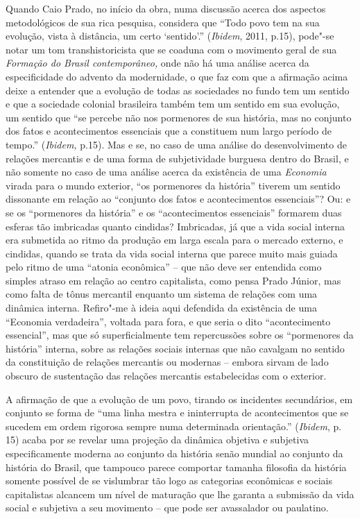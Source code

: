 Quando Caio Prado, no início da obra, numa discussão acerca dos aspectos
metodológicos de sua rica pesquisa, considera que ``Todo povo tem na sua
evolução, vista à distância, um certo `sentido'.'' (\emph{Ibidem}, 2011,
p.15), pode"-se notar um tom transhistoricista que se coaduna com o
movimento geral de sua \emph{Formação do Brasil contemporâneo,} onde não
há uma análise acerca da especificidade do advento da modernidade, o que
faz com que a afirmação acima deixe a entender que a evolução de todas
as sociedades no fundo tem um sentido e que a sociedade colonial
brasileira também tem um sentido em sua evolução, um sentido que ``se
percebe não nos pormenores de sua história, mas no conjunto dos fatos e
acontecimentos essenciais que a constituem num largo período de tempo.''
(\emph{Ibidem,} p.15). Mas e se, no caso de uma análise do
desenvolvimento de relações mercantis e de uma forma de subjetividade
burguesa dentro do Brasil, e não somente no caso de uma análise acerca
da existência de uma \emph{Economia} virada para o mundo exterior, ``os
pormenores da história'' tiverem um sentido dissonante em relação ao
``conjunto dos fatos e acontecimentos essenciais''? Ou: e se os
``pormenores da história'' e os ``acontecimentos essenciais'' formarem
duas esferas tão imbricadas quanto cindidas? Imbricadas, já que a vida
social interna era submetida ao ritmo da produção em larga escala para o
mercado externo, e cindidas, quando se trata da vida social interna que
parece muito mais guiada pelo ritmo de uma ``atonia econômica'' -- que
não deve ser entendida como simples atraso em relação ao centro
capitalista, como pensa Prado Júnior, mas como falta de tônus mercantil
enquanto um sistema de relações com uma dinâmica interna.
Refiro"-me à ideia aqui defendida da existência de uma ``Economia
verdadeira'', voltada para fora, e que seria o dito ``acontecimento
essencial'', mas que só superficialmente tem repercussões sobre os
``pormenores da história'' interna, sobre as relações sociais internas
que não cavalgam no sentido da constituição de relações mercantis ou
modernas -- embora sirvam de lado obscuro de sustentação das relações
mercantis estabelecidas com o exterior.

A afirmação de que a evolução de um povo, tirando os
incidentes secundários, em conjunto se forma de ``uma linha mestra e
ininterrupta de acontecimentos que se sucedem em ordem rigorosa sempre
numa determinada orientação.'' (\emph{Ibidem}, p. 15) acaba por se
revelar uma projeção da dinâmica objetiva e subjetiva especificamente
moderna ao conjunto da história senão mundial ao conjunto da história do
Brasil, que tampouco parece comportar tamanha filosofia da história
somente possível de se vislumbrar tão logo as categorias econômicas e
sociais capitalistas alcancem um nível de maturação que lhe garanta a
submissão da vida social e subjetiva a seu movimento -- que pode ser
avassalador ou paulatino.

